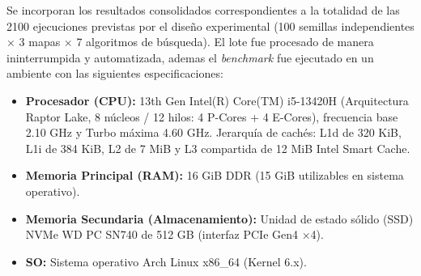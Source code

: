\documentclass[11pt,letterpaper]{article}
\begin{document}
Se incorporan los resultados consolidados correspondientes a la totalidad de las 2100 ejecuciones previstas por el diseño experimental (100 semillas independientes $\times$ 3 mapas $\times$ 7 algoritmos de búsqueda). El lote fue procesado de manera ininterrumpida y automatizada, ademas el \textit{benchmark} fue ejecutado en un ambiente con las siguientes especificaciones:

\begin{itemize}
    \item \textbf{Procesador (CPU):} 13th Gen Intel(R) Core(TM) i5-13420H (Arquitectura Raptor Lake, 8 núcleos / 12 hilos: 4 P-Cores + 4 E-Cores), frecuencia base 2.10 GHz y Turbo máxima 4.60 GHz. Jerarquía de cachés: L1d de 320 KiB, L1i de 384 KiB, L2 de 7 MiB y L3 compartida de 12 MiB Intel Smart Cache.
    \item \textbf{Memoria Principal (RAM):} 16 GiB DDR (15 GiB utilizables en sistema operativo).
    \item \textbf{Memoria Secundaria (Almacenamiento):} Unidad de estado sólido (SSD) NVMe WD PC SN740 de 512 GB (interfaz PCIe Gen4 $\times$4).
    \item \textbf{SO:} Sistema operativo Arch Linux x86\_64 (Kernel 6.x).
    
\end{itemize}
\newpage
\end{document}
